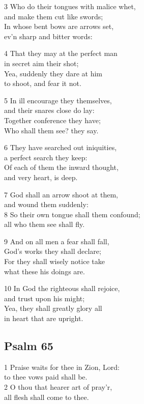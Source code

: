 3 Who do their tongues with malice whet,\\
and make them cut like swords;\\
In whose bent bows are arrows set,\\
ev’n sharp and bitter words:

4 That they may at the perfect man\\
in secret aim their shot;\\
Yea, suddenly they dare at him\\
to shoot, and fear it not.

5 In ill encourage they themselves,\\
and their snares close do lay:\\
Together conference they have;\\
Who shall them see? they say.

6 They have searched out iniquities,\\
a perfect search they keep:\\
Of each of them the inward thought,\\
and very heart, is deep.

7 God shall an arrow shoot at them,\\
and wound them suddenly:\\
8 So their own tongue shall them confound;\\
all who them see shall fly.

9 And on all men a fear shall fall,\\
God’s works they shall declare;\\
For they shall wisely notice take\\
what these his doings are.

10 In God the righteous shall rejoice,\\
and trust upon his might;\\
Yea, they shall greatly glory all\\
in heart that are upright.

\begin{center}
\quad{}\quad{}
\end{center}

\subsection*{Psalm 65}

1 Praise waits for thee in Zion, Lord:\\
to thee vows paid shall be.\\
2 O thou that hearer art of pray’r,\\
all flesh shall come to thee.

